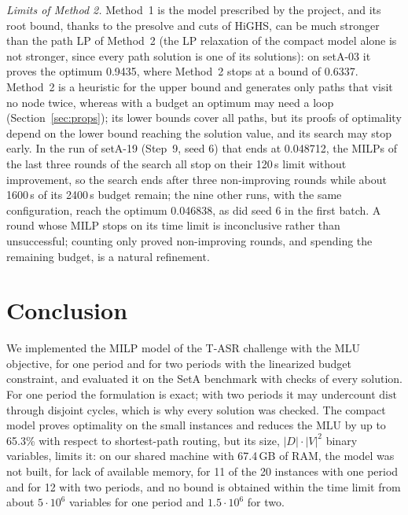 \documentclass[conference]{IEEEtran}
\begin{document}
\emph{Limits of Method 2.} Method~1 is the model prescribed by the project, and its root bound, thanks to the presolve and cuts of HiGHS, can be much stronger than the path LP of Method~2 (the LP relaxation of the compact model alone is not stronger, since every path solution is one of its solutions): on setA-03 it proves the optimum 0.9435, where Method~2 stops at a bound of 0.6337. Method~2 is a heuristic for the upper bound and generates only paths that visit no node twice, whereas with a budget an optimum may need a loop (Section~\ref{sec:props}); its lower bounds cover all paths, but its proofs of optimality depend on the lower bound reaching the solution value, and its search may stop early. In the run of setA-19 (Step~9, seed 6) that ends at 0.048712, the MILPs of the last three rounds of the search all stop on their 120\,s limit without improvement, so the search ends after three non-improving rounds while about 1600\,s of its 2400\,s budget remain; the nine other runs, with the same configuration, reach the optimum 0.046838, as did seed 6 in the first batch. A round whose MILP stops on its time limit is inconclusive rather than unsuccessful; counting only proved non-improving rounds, and spending the remaining budget, is a natural refinement.

\section{Conclusion}\label{sec:concl}

We implemented the MILP model of the T-ASR challenge with the MLU objective, for one period and for two periods with the linearized budget constraint, and evaluated it on the SetA benchmark with checks of every solution. For one period the formulation is exact; with two periods it may undercount $\mathrm{dist}$ through disjoint cycles, which is why every solution was checked. The compact model proves optimality on the small instances and reduces the MLU by up to 65.3\% with respect to shortest-path routing, but its size, $|D|\cdot|V|^2$ binary variables, limits it: on our shared machine with 67.4\,GB of RAM, the model was not built, for lack of available memory, for 11 of the 20 instances with one period and for 12 with two periods, and no bound is obtained within the time limit from about $5\cdot10^6$ variables for one period and $1.5\cdot10^6$ for two.
\end{document}
